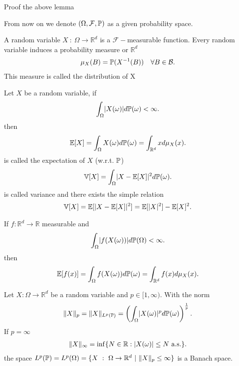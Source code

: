 \begin{exercise}
  Proof the above lemma
\end{exercise}
From now on we denote $(\Omega ,\mathcal{F},\P)$ as a given probability space.
\begin{definition}
 A random variable $X \ : \ \Omega  \to \mathbb{R}^{d} $  is a $\mathcal{F}-$measurable function.
 Every random variable induces a probability measure or $\mathbb{R}^{d} $ 
 \begin{align*}
  \mu_X(B) = \P(X^{-1}(B) ) \quad \forall B \in  \mathcal{B}
 .\end{align*}
This measure is called the distribution of X
\end{definition}
\begin{definition}
 Let $X$ be a random variable, if 
 \begin{align*}
   \int_{\Omega } \abs{X(\omega )}d\P(\omega ) < \infty
 .\end{align*}
 then 
 \begin{align*}
   \E[X] = \int_{\Omega } X(\omega ) d\P(\omega ) =  \int_{\mathbb{R}^{d} }x d\mu_X(x)
 .\end{align*}
 is called the expectation of $X$ (w.r.t. $\P$) \\[1ex]
 \begin{align*}
   \V[X] = \int_{\Omega } \abs{X - \E[X]}^2 d\P(\omega )
 .\end{align*}
 is called variance and there exists the simple relation 
 \begin{align*}
   \V[X] = \E[\abs{X-\E[X]}^2] = \E[\abs{X}^2] - \E[X]^2
 .\end{align*}
\end{definition}
\begin{remark}
 If $f : \mathbb{R}^{d} \to  \mathbb{R} $ measurable and 
 \begin{align*}
   \int_{\Omega } \abs{f(X(\omega ))} d\P(\Omega ) <\infty
 .\end{align*}
 then 
 \begin{align*}
   \E[f(x)] = \int_{\Omega }f(X(\omega ))d\P(\omega ) = \int_{\mathbb{R}^{d} }f(x) d\mu_X(x)
 .\end{align*}
\end{remark}
\begin{definition}[$L^p$ spaces]
  Let $X : \Omega  \to  \mathbb{R}^{d} $  be a random variable and $p \in [1,\infty)$.
  With the norm 
  \begin{align*}
    \|X\|_p = \|X\|_{L^{p}(\P ) } = \left( \int_{\Omega} \abs{X(\omega )}^{p} d\P(\omega )  \right)^{\frac{1}{p}} 
  .\end{align*}
  If $p=\infty$ 
  \begin{align*}
    \|X\|_{\infty} = \inf \{N \in  \mathbb{R} : \abs{X(\omega )} \le  N \text{ a.s.}\}  
  .\end{align*}
  the space $L^{p}(\P ) = L^{p}(\Omega ) = \{X \ : \ \Omega  \to  \mathbb{R}^{d}  \ | \ \|X\|_p \le \infty \}    $ is a Banach space.
\end{definition}
